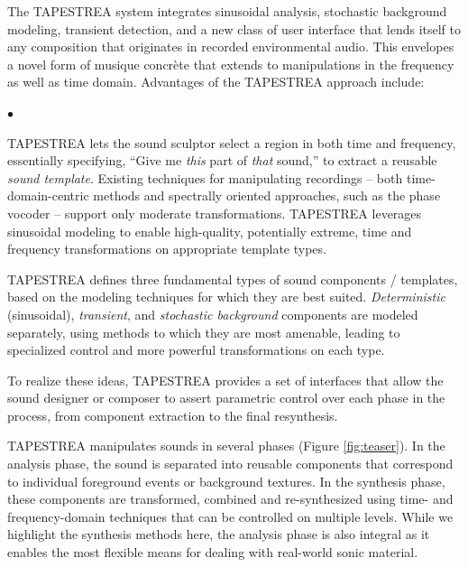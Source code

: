 \documentclass[10pt,letterpaper]{article}
\newenvironment{myitemize}{\begin{list}{$\bullet$}
{\setlength{\itemsep}{.25pt}\setlength{\parsep}{0pt}\settowidth{\leftmargin}{$\bullet$~}}}
{\end{list}}
\begin{document}
The TAPESTREA system integrates sinusoidal analysis, stochastic background
modeling, transient detection, and a new class of user interface that
lends itself to any composition that originates in recorded
environmental audio. This envelopes a novel form of musique concr\`ete
that extends to manipulations in the frequency as well as time domain.
Advantages of the TAPESTREA approach include:
\begin{myitemize}
\setlength{\itemsep}{2pt}
\item TAPESTREA lets the sound sculptor select a region in both 
time and frequency, essentially specifying, ``Give me \textit{this} part of
\textit{that} sound,'' to extract a reusable 
\textit{sound template}. 
Existing techniques for manipulating
recordings -- both time-domain-centric methods and spectrally oriented 
approaches, such as the phase vocoder -- support only moderate transformations.
TAPESTREA leverages sinusoidal modeling to enable high-quality,
potentially extreme, time and frequency transformations on appropriate 
template types.
\item TAPESTREA defines three fundamental types of sound components / templates, based
on the modeling techniques for which they are best suited. {\it Deterministic}
(sinusoidal), {\it transient}, and {\it stochastic background} components are
modeled separately, using methods to which they are most amenable,
leading to specialized control and more powerful transformations on 
each type.
\item To realize these ideas, TAPESTREA provides a set of interfaces 
that allow the sound designer or composer to assert parametric  
control over each phase in the process, from component extraction to the 
final resynthesis. 
\end{myitemize}

TAPESTREA manipulates sounds in several phases (Figure \ref{fig:teaser}). In the analysis
phase, the sound is separated into reusable components that correspond to
individual foreground events or background textures. In the synthesis phase,
these components are transformed, combined and re-synthesized using
time- and freq\-uency-domain techniques that can be controlled on multiple
levels. While we highlight the synthesis methods here, the analysis
phase is also integral as it enables the most flexible means for dealing
with real-world sonic material.
\end{document}
